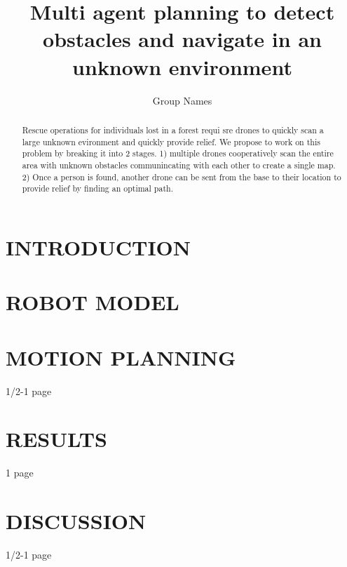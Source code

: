 \documentclass[letterpaper, 10 pt, conference]{ieeeconf}  %
\title{\LARGE \bf Multi agent planning to detect obstacles and navigate in an unknown environment}
\author{Group Names}%
\begin{document}
\maketitle
\thispagestyle{empty}
\pagestyle{empty}


\begin{abstract}
 Rescue operations for individuals lost in a forest requi sre drones to quickly scan a large unknown evironment and quickly provide relief. We propose to work on this problem by breaking it into 2 stages. 1) multiple drones cooperatively scan the entire area with unknown obstacles communincating with each other to create a single map. 2) Once a person is found, another drone can be sent from the base to their location to provide relief by finding an optimal path.
\end{abstract}

\section{INTRODUCTION}

\section{ROBOT MODEL}
 
\section{MOTION PLANNING}
 1/2-1 page

\section{RESULTS}
1 page

\section{DISCUSSION}
1/2-1 page
 

\addtolength{\textheight}{-12cm}   %
\end{document}
